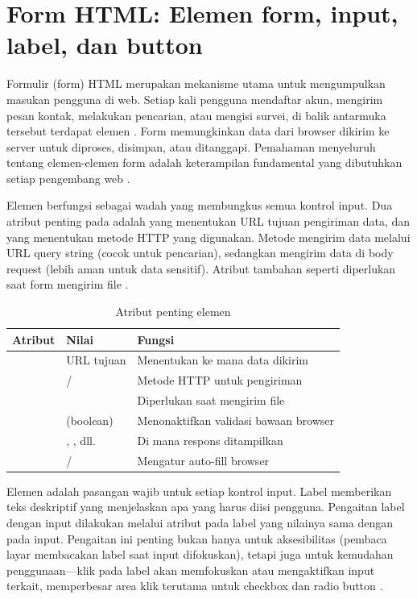 ﻿\section{Form HTML: Elemen form, input, label, dan button}

Formulir (form) HTML merupakan mekanisme utama untuk mengumpulkan masukan pengguna di web. Setiap kali pengguna mendaftar akun, mengirim pesan kontak, melakukan pencarian, atau mengisi survei, di balik antarmuka tersebut terdapat elemen . Form memungkinkan data dari browser dikirim ke server untuk diproses, disimpan, atau ditanggapi. Pemahaman menyeluruh tentang elemen-elemen form adalah keterampilan fundamental yang dibutuhkan setiap pengembang web \cite{mdnHtmlIntro}.

Elemen  berfungsi sebagai wadah yang membungkus semua kontrol input. Dua atribut penting pada  adalah  yang menentukan URL tujuan pengiriman data, dan  yang menentukan metode HTTP yang digunakan. Metode  mengirim data melalui URL query string (cocok untuk pencarian), sedangkan  mengirim data di body request (lebih aman untuk data sensitif). Atribut tambahan seperti  diperlukan saat form mengirim file \cite{webdevHtml}.

\begin{table}[H]
\centering
\begin{tabular}{|P{2.5cm}|P{4cm}|P{5.5cm}|}
\hline
\textbf{Atribut} & \textbf{Nilai} & \textbf{Fungsi} \\
\hline
{} & URL tujuan & Menentukan ke mana data dikirim \\
\hline
{} &  /  & Metode HTTP untuk pengiriman \\
\hline
{} &  & Diperlukan saat mengirim file \\
\hline
{} & (boolean) & Menonaktifkan validasi bawaan browser \\
\hline
{} & , , dll. & Di mana respons ditampilkan \\
\hline
{} &  /  & Mengatur auto-fill browser \\
\hline
\end{tabular}
\caption{Atribut penting elemen }
\end{table}

Elemen  adalah pasangan wajib untuk setiap kontrol input. Label memberikan teks deskriptif yang menjelaskan apa yang harus diisi pengguna. Pengaitan label dengan input dilakukan melalui atribut  pada label yang nilainya sama dengan  pada input. Pengaitan ini penting bukan hanya untuk aksesibilitas (pembaca layar membacakan label saat input difokuskan), tetapi juga untuk kemudahan penggunaan---klik pada label akan memfokuskan atau mengaktifkan input terkait, memperbesar area klik terutama untuk checkbox dan radio button \cite{mdnAccessibility}.

